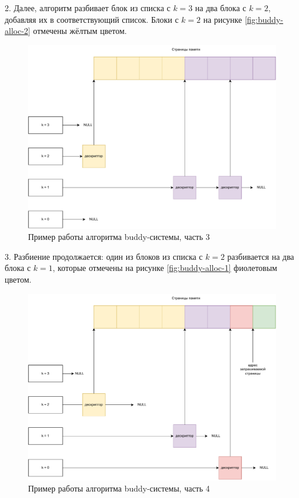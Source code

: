 2. Далее, алгоритм разбивает блок из списка с $k = 3$ на два блока с $k = 2$, добавляя их в соответствующий список. Блоки с $k = 2$ на рисунке \ref{fig:buddy-alloc-2} отмечены жёлтым цветом. 

\begin{figure}[h]
	\centering
	\includegraphics[width=\textwidth]{img/buddy-allocator-3.pdf}
	\caption{Пример работы алгоритма buddy-системы, часть 3}
	\label{fig:buddy-alloc-3}
\end{figure}

3. Разбиение продолжается: один из блоков из списка с $k = 2$ разбивается на два блока с $k = 1$, которые отмечены на рисунке \ref{fig:buddy-alloc-1} фиолетовым цветом.

\begin{figure}[h]
	\centering
	\includegraphics[width=\textwidth]{img/buddy-allocator-4.pdf}
	\caption{Пример работы алгоритма buddy-системы, часть 4}
	\label{fig:buddy-alloc-4}
\end{figure}

